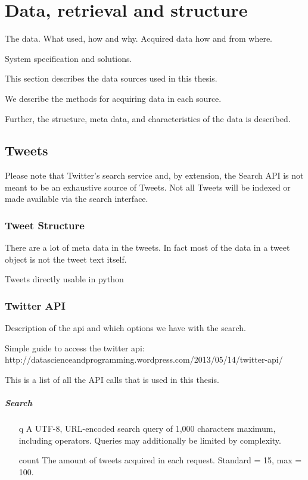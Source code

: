 \chapter{Data, retrieval and structure}
The data. What used, how and why. Acquired data how and from where. 

System specification and solutions. 

This section describes the data sources used in this thesis. 

We describe the methods for acquiring data in each source. 

Further, the structure, meta data, and characteristics of the data is
described. 

\section{Tweets}

Please note that Twitter's search service and, by extension, the Search API is
not meant to be an exhaustive source of Tweets. Not all Tweets will be indexed
or made available via the search interface. 

\subsection{Tweet Structure}
There are a lot of meta data in the tweets. In fact most of the data in a tweet
object is not the tweet text itself.

Tweets directly usable in python

\subsection{Twitter API}
Description of the api and which options we have with the search. 

Simple guide to access the twitter api:  http://datascienceandprogramming.wordpress.com/2013/05/14/twitter-api/

This is a list of all the API calls that is used in this thesis.
\paragraph{Search} 
\begin{itemize}
\item[q] A UTF-8, URL-encoded search query of 1,000 characters maximum, including
operators. Queries may additionally be limited by complexity.

\item[count] The amount of tweets acquired in each request. Standard = 15, max
= 100. 

\end{itemize}

